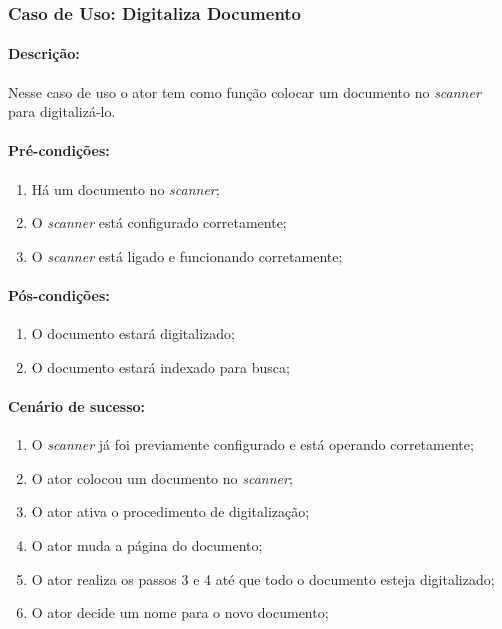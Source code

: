 \subsubsection{Caso de Uso: Digitaliza Documento}

\paragraph{Descrição:}
Nesse caso de uso o ator tem como função colocar um documento no {\it scanner} para digitalizá-lo.

\paragraph{Pré-condições:}
\begin{enumerate}
    \item Há um documento no {\it scanner};
    \item O {\it scanner} está configurado corretamente;
    \item O {\it scanner} está ligado e funcionando corretamente;
\end{enumerate}

\paragraph{Pós-condições:} 
\begin{enumerate}
    \item O documento estará digitalizado;
    \item O documento estará indexado para busca;
\end{enumerate}

\paragraph{Cenário de sucesso:}
\begin{enumerate}
    \item O {\it scanner} já foi previamente configurado e está operando corretamente;
    \item O ator colocou um documento no {\it scanner};
    \item O ator ativa o procedimento de digitalização;
    \item O ator muda a página do documento;
    \item O ator realiza os passos 3 e 4 até que todo o documento esteja digitalizado;
    \item O ator decide um nome para o novo documento;
\end{enumerate}

